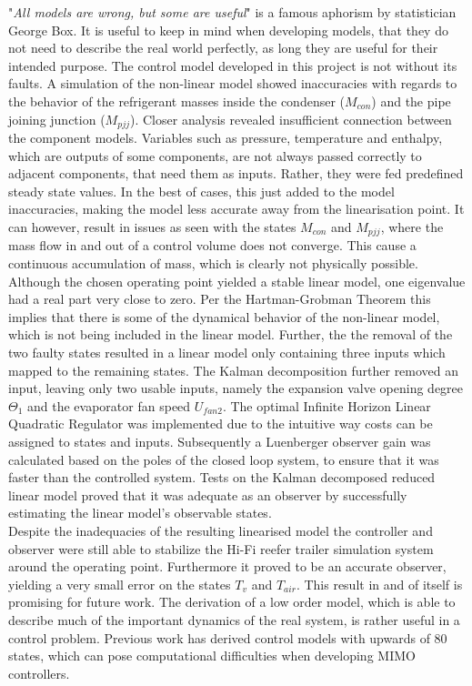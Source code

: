 "\textit{All models are wrong, but some are useful}" is a famous aphorism by statistician George Box. It is useful to keep in mind when developing models, that they do not need to describe the real world perfectly, as long they are useful for their intended purpose. The control model developed in this project is not without its faults. A simulation of the non-linear model showed inaccuracies with regards to the behavior of the refrigerant masses inside the condenser ($M_{con}$) and the pipe joining junction ($M_{pjj}$). Closer analysis revealed insufficient connection between the component models. Variables such as pressure, temperature and enthalpy, which are outputs of some components, are not always passed correctly to adjacent components, that need them as inputs. Rather, they were fed predefined steady state values. In the best of cases, this just added to the model inaccuracies, making the model less accurate away from the linearisation point. It can however, result in issues as seen with the states $M_{con}$ and $M_{pjj}$, where the mass flow in and out of a control volume does not converge. This cause a continuous accumulation of mass, which is clearly not physically possible. \\

Although the chosen operating point yielded a stable linear model, one eigenvalue had a real part very close to zero. Per the Hartman-Grobman Theorem this implies that there is some of the dynamical behavior of the non-linear model, which is not being included in the linear model. Further, the the removal of the two faulty states resulted in a linear model only containing three inputs which mapped to the remaining states. The Kalman decomposition further removed an input, leaving only two usable inputs, namely the expansion valve opening degree $\Theta_1$ and the evaporator fan speed $U_{fan2}$. The optimal Infinite Horizon Linear Quadratic Regulator was implemented due to the intuitive way costs can be assigned to states and inputs. Subsequently a Luenberger observer gain was calculated based on the poles of the closed loop system, to ensure that it was faster than the controlled system. Tests on the Kalman decomposed reduced linear model proved that it was adequate as an observer by successfully estimating the linear model's observable states.\\

Despite the inadequacies of the resulting linearised model the controller and observer were still able to stabilize the Hi-Fi reefer trailer simulation system around the operating point. Furthermore it proved to be an accurate observer, yielding a very small error on the states $T_v$ and $T_{air}$. This result in and of itself is promising for future work. The derivation of a low order model, which is able to describe much of the important dynamics of the real system, is rather useful in a control problem. Previous work has derived control models with upwards of 80 states, which can pose computational difficulties when developing MIMO controllers.\\

